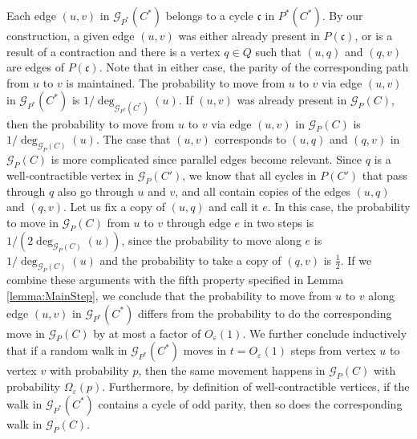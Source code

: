 \documentclass[11pt]{article}
\def\epsilon{\ensuremath{\varepsilon}}
\begin{document}
Each edge $(u,v)$ in $\mathcal{G}_{P^*}(C^*)$ belongs to a cycle $\mathfrak c$ in $P^*(C^*)$. By our construction, a given edge $(u,v)$ was either already present in $P(\mathfrak{c})$, or is a result of a contraction and there is a vertex $q \in Q$ such that $(u,q)$ and $(q,v)$ are edges of $P(\mathfrak{c})$. Note that in either case, the parity of the corresponding path from $u$ to $v$ is maintained. The probability to move from $u$ to $v$ via edge $(u,v)$ in $\mathcal{G}_{P^*}(C^*)$ is $1/\deg_{\mathcal{G}_{P^*}(C^*)}(u)$. If $(u,v)$ was already present in $\mathcal{G}_{P}(C)$, then the probability to move from $u$ to $v$ via edge $(u,v)$ in $\mathcal{G}_{P}(C)$ is $1/\deg_{\mathcal{G}_{P}(C)}(u)$. The case that $(u,v)$ corresponds to $(u,q)$ and $(q,v)$ in $\mathcal{G}_{P}(C)$ is more complicated since parallel edges become relevant. Since $q$ is a well-contractible vertex in $\mathcal G_P(C')$, we know that all cycles in $P(C')$ that pass through $q$ also go through $u$ and $v$, and all contain copies of the edges $(u,q)$ and $(q,v)$. Let us fix a copy of $(u,q)$ and call it $e$. In this case, the probability to move in $\mathcal{G}_{P}(C)$ from $u$ to $v$ through edge $e$ in two steps is
$1/(2\deg_{\mathcal{G}_{P}(C)}(u))$,
since the probability to move along $e$ is $1/\deg_{\mathcal{G}_{P}(C)}(u)$ and the probability to take a copy of $(q,v)$ is $\frac12$.
If we combine these arguments with the fifth property specified in Lemma \ref{lemma:MainStep}, we conclude that the probability to move from $u$ to $v$ along edge $(u,v)$ in $\mathcal{G}_{P^*}(C^*)$ differs from the probability to do the corresponding move in $\mathcal{G}_{P}(C)$ by at most a factor of $O_\epsilon(1)$. We further conclude inductively that if a random walk in $\mathcal{G}_{P^*}(C^*)$ moves in $t = O_{\epsilon}(1)$ steps from vertex $u$ to vertex $v$ with probability $p$, then the same movement happens in $\mathcal{G}_{P}(C)$ with probability $\Omega_{\epsilon}(p)$. Furthermore, by definition of well-contractible vertices, if the walk in $\mathcal{G}_{P^*}(C^*)$ contains a cycle of odd parity, then so does the corresponding walk in $\mathcal{G}_{P}(C)$.
\end{document}
